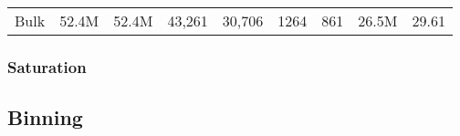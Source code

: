 \begin{table}[h]
\begin{tabular}{|l|rrrrrrrl}
Bulk                           & 52.4M                                   & 52.4M                                                                                               & 43,261                                 & 30,706                                 & 1264                            & 861                                     & 26.5M                                             & 29.61                     \\ \cline{1-1}
\end{tabular}
\end{table}



\subsubsection{Saturation}

\subsection{Binning}

%



